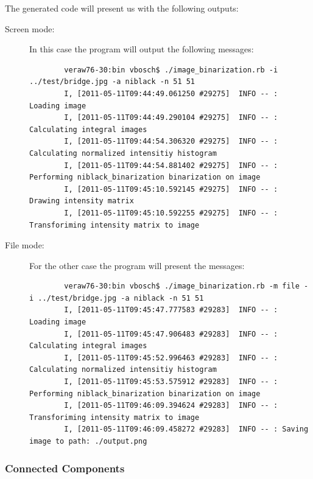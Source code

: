 \documentclass[a4paper,10pt,titlepage]{article}
\begin{document}
\par The generated code will present us with the following outputs:
\begin{description}
	\item[Screen mode:] In this case the program will output the following messages:
		{\footnotesize\begin{verbatim}
		veraw76-30:bin vbosch$ ./image_binarization.rb -i ../test/bridge.jpg -a niblack -n 51 51
		I, [2011-05-11T09:44:49.061250 #29275]  INFO -- : Loading image
		I, [2011-05-11T09:44:49.290104 #29275]  INFO -- : Calculating integral images
		I, [2011-05-11T09:44:54.306320 #29275]  INFO -- : Calculating normalized intensitiy histogram
		I, [2011-05-11T09:44:54.881402 #29275]  INFO -- : Performing niblack_binarization binarization on image
		I, [2011-05-11T09:45:10.592145 #29275]  INFO -- : Drawing intensity matrix
		I, [2011-05-11T09:45:10.592255 #29275]  INFO -- : Transforiming intensity matrix to image
		\end{verbatim}}
	\item[File mode:] For the other case the program will present the messages:
	{\footnotesize\begin{verbatim}
		veraw76-30:bin vbosch$ ./image_binarization.rb -m file -i ../test/bridge.jpg -a niblack -n 51 51
		I, [2011-05-11T09:45:47.777583 #29283]  INFO -- : Loading image
		I, [2011-05-11T09:45:47.906483 #29283]  INFO -- : Calculating integral images
		I, [2011-05-11T09:45:52.996463 #29283]  INFO -- : Calculating normalized intensitiy histogram
		I, [2011-05-11T09:45:53.575912 #29283]  INFO -- : Performing niblack_binarization binarization on image
		I, [2011-05-11T09:46:09.394624 #29283]  INFO -- : Transforiming intensity matrix to image
		I, [2011-05-11T09:46:09.458272 #29283]  INFO -- : Saving image to path: ./output.png
	\end{verbatim}}
\end{description}

\subsubsection{Connected Components}
\end{document}
